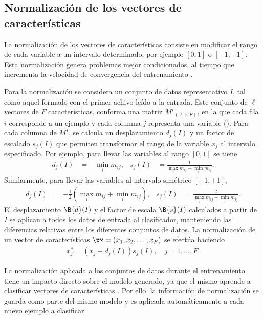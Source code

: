 %
%
%
\subsection{Normalización de los vectores de características}
%

La normalización de los vectores de características consiste en
modificar el rango de cada variable a un intervalo determinado, por
ejemplo $[0,1]$ o $[-1,+1]$. Esta normalización genera problemas mejor
condicionados, al tiempo que incrementa la velocidad de convergencia
del entrenamiento \cite{nnfaq2}.

Para la normalización se considera un conjunto de datos representativo
$I$, tal como aquel formado con el primer achivo leído a la entrada.
Este conjunto de $\ell$ vectores de $F$ características, conforma una
matriz $M^I{}_{(\ell\times{}F)}$, en la que cada fila $i$ corresponde
a un ejemplo y cada columna $j$ representa una variable
(\caract{}). Para cada columna de $M^I$, se calcula un desplazamiento
$d_j(I)$ y un factor de escalado $s_j(I)$ que permiten transformar el
rango de la variable $x_j$ al intervalo especificado. Por ejemplo,
para llevar las variables al rango $[0,1]$ se tiene
%
\begin{align}
  d_j(I) &= - \min_i m_{ij}, &
  s_j(I) &= \frac{1}{\max_i m_{ij} - \min_i m_{ij}}.
\end{align}
%
Similarmente, para llevar las variables al intervalo simétrico
$[-1,+1]$,
%
\begin{align}
  d_j(I) &= -\frac{1}{2}\left(\max_i m_{ij} + \min_i m_{ij}\right), &
  s_j(I) &= \frac{2}{\max_i m_{ij} - \min_i m_{ij}}.
\end{align}
%
El desplazamiento $\B{d}(I)$ y el factor de escala $\B{s}(I)$
calculados a partir de $I$ se aplican a todos los datos
de entrada al clasificador, manteniendo las diferencias relativas
entre los diferentes conjuntos de datos. La normalización de un
vector de características $\xx=(x_{1},x_{2},\ldots,x_{F})$ se
efectúa haciendo
%
\begin{align}
  x_j^{*} = ( x_j + d_j(I) ) s_j(I), \quad j=1,\ldots,F.
\end{align}
%

La normalización aplicada a los conjuntos de datos durante el
entrenamiento tiene un impacto directo sobre el modelo generado, ya
que el mismo aprende a clasificar vectores de características
. Por ello, la información de normalización se guarda
como parte del mismo modelo y es aplicada automáticamente a cada nuevo
ejemplo a clasificar.
